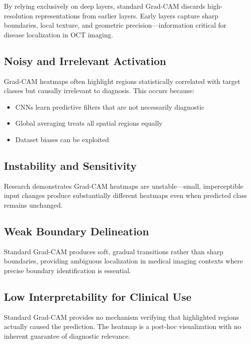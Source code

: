 \documentclass[12pt,a4paper,oneside]{book}
\begin{document}
By relying exclusively on deep layers, standard Grad-CAM discards high-resolution representations from earlier layers. Early layers capture sharp boundaries, local texture, and geometric precision—information critical for disease localization in OCT imaging.

\subsection{Noisy and Irrelevant Activation}

Grad-CAM heatmaps often highlight regions statistically correlated with target classes but causally irrelevant to diagnosis. This occurs because:

\begin{itemize}
  \item CNNs learn predictive filters that are not necessarily diagnostic
  \item Global averaging treats all spatial regions equally
  \item Dataset biases can be exploited
\end{itemize}

\subsection{Instability and Sensitivity}

Research demonstrates Grad-CAM heatmaps are unstable—small, imperceptible input changes produce substantially different heatmaps even when predicted class remains unchanged.

\subsection{Weak Boundary Delineation}

Standard Grad-CAM produces soft, gradual transitions rather than sharp boundaries, providing ambiguous localization in medical imaging contexts where precise boundary identification is essential.

\subsection{Low Interpretability for Clinical Use}

Standard Grad-CAM provides no mechanism verifying that highlighted regions actually caused the prediction. The heatmap is a post-hoc visualization with no inherent guarantee of diagnostic relevance.
\end{document}
